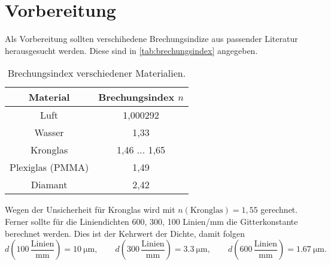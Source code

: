 \section{Vorbereitung}
\label{sec:Vorbereitung}
Als Vorbereitung sollten verschihedene Brechungsindize aus passender Literatur
herausgesucht werden. Diese sind in \autoref{tab:brechungsindex} angegeben.
\begin{table}
	\centering
	\caption{Brechungsindex verschiedener Materialien. \cite{cosmos-indirekt}}
	\label{tab:brechungsindex}
	\begin{tabular}{c c}
		\toprule
		Material &
		Brechungsindex $n$ \\
		\midrule
		Luft 		& 1,000292 \\
		Wasser		& 1,33 \\
		Kronglas	& 1,46 ... 1,65 \\
		Plexiglas (PMMA)& 1,49 \\
		Diamant		& 2,42 \\
		\bottomrule
	\end{tabular}
\end{table}
Wegen der Unsicherheit für Kronglas wird mit $n(\text{Kronglas}) = 1,55$ gerechnet.
\\
Ferner sollte für die Liniendichten 600, 300, 100 Linien/mm die Gitterkonstante berechnet
werden. Dies ist der Kehrwert der Dichte, damit folgen
\begin{equation}
	d\left(100 \, \frac{\text{Linien}}{\si{\milli\meter}} \right) 
	= \SI{10}{\micro\meter},
	\qquad
	d\left(300 \, \frac{\text{Linien}}{\si{\milli\meter}} \right) 
	= \SI{3,3}{\micro\meter},
	\qquad
	d\left(600 \, \frac{\text{Linien}}{\si{\milli\meter}} \right) 
	= \SI{1,67}{\micro\meter}.
\end{equation}

